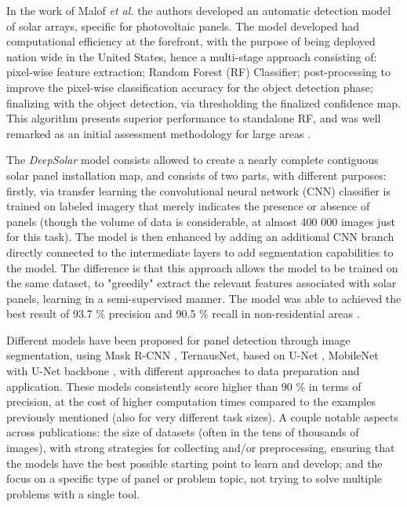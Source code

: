 \documentclass[conference]{IEEEtran}
\begin{document}
In the work of Malof \textit{et al.} the authors developed an automatic detection model of solar arrays, specific for photovoltaic panels. The model developed had computational efficiency at the forefront, with the purpose of being deployed nation wide in the United States, hence a multi-stage approach consisting of: pixel-wise feature extraction; Random Forest (RF) Classifier; post-processing to improve the pixel-wise classification accuracy for the object detection phase; finalizing with the object detection, via thresholding the finalized confidence map. This algorithm presents superior performance to standalone RF, and was well remarked as an initial assessment methodology for large areas \cite{Malof_2016}. 

The \textit{DeepSolar} model consists allowed to create a nearly complete contiguous solar panel installation map, and consists of two parts, with different purposes: firstly, via transfer learning the convolutional neural network (CNN) classifier is trained on labeled imagery that merely indicates the presence or absence of panels (though the volume of data is considerable, at almost 400 000 images just for this task). The model is then enhanced by adding an additional CNN branch directly connected to the intermediate layers to add segmentation capabilities to the model. The difference is that this approach allows the model to be trained on the same dataset, to "greedily" extract the relevant features associated with solar panels, learning in a semi-supervised manner. The model was able to achieved the best result of 93.7 \% precision and 90.5 \% recall in non-residential areas \cite{Yu2018DeepSolar}.

Different models have been proposed for panel detection through image segmentation, using Mask R-CNN \cite{maskrcnn} , TernausNet, based on U-Net \cite{KAUSIKA2021100111}, MobileNet with U-Net backbone \cite{wani2021segmentation}, with different approaches to data preparation and application. These models consistently score higher than 90 \% in terms of precision, at the cost of higher computation times compared to the examples previously mentioned (also for very different task sizes). A couple notable aspects across publications: the size of datasets (often in the tens of thousands of images), with strong strategies for collecting and/or preprocessing, ensuring that the models have the best possible starting point to learn and develop; and the focus on a specific type of panel or problem topic, not trying to solve multiple problems with a single tool.
\end{document}
